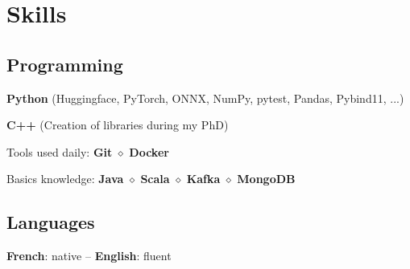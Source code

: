 \documentclass[]{deedy-resume-openfont}
\begin{document}
\sectionsep




\begin{minipage}[t]{0.39\textwidth}


	\section{Skills}
	\vspace{0.1cm}

	\subsection{Programming}

	\vspace{\topsep}
	\vspace{0.1cm}
	\begin{tightemize}
		\item[\diamond] \textbf{Python} (Huggingface, PyTorch, ONNX, NumPy, pytest, Pandas, Pybind11, ...)
		\item[\diamond] \textbf{C++} (Creation of libraries during my PhD)
		\item[\diamond] Tools used daily: \textbf{Git} $\diamond$ \textbf{Docker}
		\item[\diamond] Basics knowledge: \textbf{Java} $\diamond$ \textbf{Scala} $\diamond$ \textbf{Kafka} $\diamond$ \textbf{MongoDB}
	\end{tightemize}

	\sectionsep
	\vspace{0.1cm}
	\subsection{Languages}
	\vspace{0.1cm}
	\textbf{French}: native -- \textbf{English}: fluent


\end{minipage}
\end{document}
